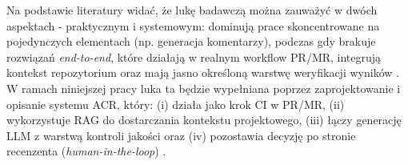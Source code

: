 Na podstawie literatury widać, że lukę badawczą można zauważyć w dwóch aspektach - praktycznym i systemowym: 
dominują prace skoncentrowane na pojedynczych elementach (np. generacja komentarzy), 
podczas gdy brakuje rozwiązań \emph{end-to-end}, które działają w realnym workflow PR/MR, 
integrują kontekst repozytorium oraz mają jasno określoną warstwę weryfikacji 
wyników \cite{Tufano2024CodeReviewAutomation, Ren2025HydraReviewer, Ramesh2025EricssonExperience}. 
W ramach niniejszej pracy luka ta będzie wypełniana poprzez zaprojektowanie i opisanie 
systemu ACR, który: (i) działa jako krok CI w PR/MR, (ii) wykorzystuje RAG do 
dostarczania kontekstu projektowego, (iii) łączy generację LLM z warstwą 
kontroli jakości oraz (iv) pozostawia decyzję po stronie recenzenta 
(\emph{human-in-the-loop}) \cite{Meng2025RARe, Jaoua2025LLMStaticAnalyzersCR, Lin2025CodeReviewQA}.







